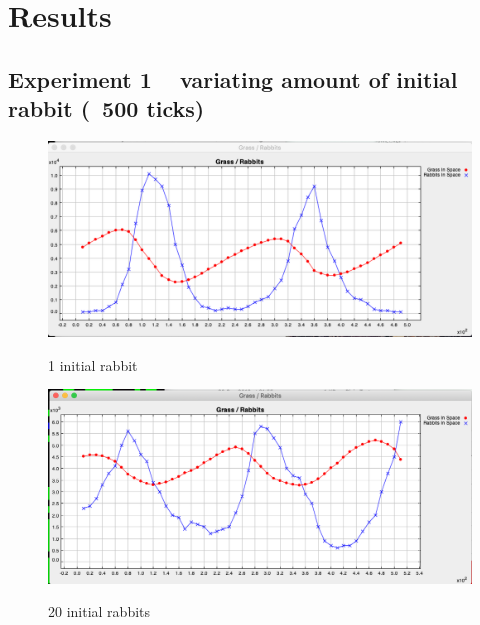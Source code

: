 \documentclass[11pt]{article}
\begin{document}

\section{Results}

\subsection{Experiment 1 ~ variating amount of initial rabbit (~500 ticks)}

\begin{figure}[H]
\includegraphics[width=1.0\textwidth]{ex1-chart-1}
\centering
\label{fig:ex1-1}
\caption{ 1 initial rabbit }
\end{figure}

\begin{figure}[H]
\includegraphics[width=1.0\textwidth]{ex1-chart-20}
\centering
\label{fig:ex1-20}
\caption{ 20 initial rabbits }
\end{figure}
\end{document}
